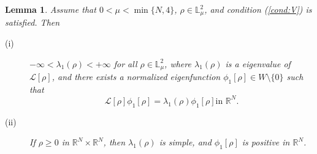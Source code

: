 \documentclass[12pt,thmsa]{article}
\newtheorem{lemma}[theorem]{Lemma}
\begin{document}
\begin{lemma}
\label{lem:2} Assume that $0<\mu <\min \{N,4\}$, $\rho \in \mathbb{L}_{\mu
}^{2}$, and condition (\ref{cond:V}) is satisfied. Then

\begin{description}
\item[\textrm{(i)}] $-\infty <\lambda _{1}(\rho )<+\infty $ for all $\rho
\in \mathbb{L}_{\mu }^{2}$, where $\lambda _{1}(\rho )$ is a eigenvalue of $%
\mathcal{L}[\rho ]$, and there exists a normalized eigenfunction $\phi
_{1}[\rho ]\in W\setminus \{0\}$ such that
\begin{equation}
\mathcal{L}[\rho ]\phi _{1}[\rho ]=\lambda _{1}(\rho )\phi _{1}[\rho ]\text{
in }\mathbb{R}^{N}.  \label{eq:LinP}
\end{equation}

\item[\textrm{(ii)}] If $\rho \geq 0$ in $\mathbb{R}^{N}\times \mathbb{R}%
^{N} $, then $\lambda _{1}(\rho )$ is simple, and $\phi _{1}[\rho ]$ is
positive in $\mathbb{R}^{N}$.
\end{description}
\end{lemma}
\end{document}
